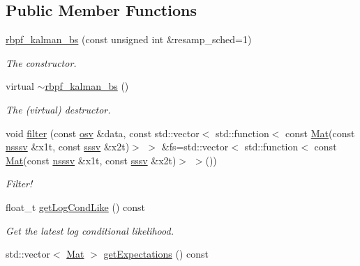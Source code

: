 \subsection*{Public Member Functions}
\begin{DoxyCompactItemize}
\item 
\hyperlink{classrbpf__kalman__bs_afbd99010c2198c6153bfaf9f11a50299}{rbpf\+\_\+kalman\+\_\+bs} (const unsigned int \&resamp\+\_\+sched=1)
\begin{DoxyCompactList}\small\item\em The constructor. \end{DoxyCompactList}\item 
\mbox{\label{classrbpf__kalman__bs_af065083e1bea86180b650e4f280cf2b0}} 
virtual \hyperlink{classrbpf__kalman__bs_af065083e1bea86180b650e4f280cf2b0}{$\sim$rbpf\+\_\+kalman\+\_\+bs} ()
\begin{DoxyCompactList}\small\item\em The (virtual) destructor. \end{DoxyCompactList}\item 
void \hyperlink{classrbpf__kalman__bs_a241e90ba673be5398f17eccc52b727bf}{filter} (const \hyperlink{classrbpf__kalman__bs_a51f159fe3b1d23742ba06d82d4724186}{osv} \&data, const std\+::vector$<$ std\+::function$<$ const \hyperlink{classrbpf__kalman__bs_add5db33a27f25ec3e72ecd8e4c9ce755}{Mat}(const \hyperlink{classrbpf__kalman__bs_a896c6ca25182e5569df4bfa6c40f9a54}{nsssv} \&x1t, const \hyperlink{classrbpf__kalman__bs_a2b40c9fa0d7a2ca42be3d0c43db0db8b}{sssv} \&x2t)$>$ $>$ \&fs=std\+::vector$<$ std\+::function$<$ const \hyperlink{classrbpf__kalman__bs_add5db33a27f25ec3e72ecd8e4c9ce755}{Mat}(const \hyperlink{classrbpf__kalman__bs_a896c6ca25182e5569df4bfa6c40f9a54}{nsssv} \&x1t, const \hyperlink{classrbpf__kalman__bs_a2b40c9fa0d7a2ca42be3d0c43db0db8b}{sssv} \&x2t)$>$ $>$())
\begin{DoxyCompactList}\small\item\em Filter! \end{DoxyCompactList}\item 
float\+\_\+t \hyperlink{classrbpf__kalman__bs_af2ddf0fc3bf89516f3ebc8187b055a57}{get\+Log\+Cond\+Like} () const
\begin{DoxyCompactList}\small\item\em Get the latest log conditional likelihood. \end{DoxyCompactList}\item 
std\+::vector$<$ \hyperlink{classrbpf__kalman__bs_add5db33a27f25ec3e72ecd8e4c9ce755}{Mat} $>$ \hyperlink{classrbpf__kalman__bs_af4874bee4d5ea66fda9c4212b6030af7}{get\+Expectations} () const

\end{DoxyCompactItemize}
